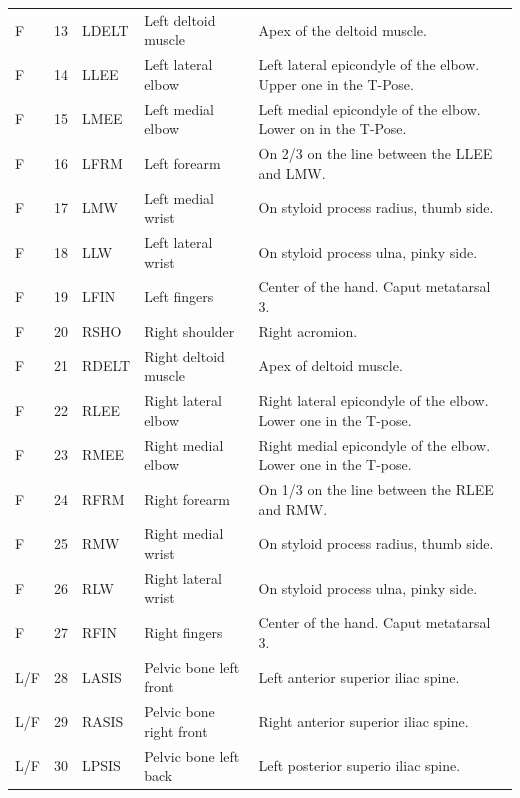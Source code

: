 \documentclass[fleqn,10pt]{wlpeerj}
\begin{document}
\begin{table}
\begin{tabular}{lrlll}
    F   & 13 & LDELT & Left deltoid muscle                   & Apex of the deltoid muscle. \\
    F   & 14 & LLEE  & Left lateral elbow                    & Left lateral epicondyle of the elbow. Upper one in the T-Pose. \\
    F   & 15 & LMEE  & Left medial elbow                     & Left medial epicondyle of the elbow. Lower on in the T-Pose. \\
    F   & 16 & LFRM  & Left forearm                          & On 2/3 on the line between the LLEE and LMW. \\
    F   & 17 & LMW   & Left medial wrist                     & On styloid process radius, thumb side. \\
    F   & 18 & LLW   & Left lateral wrist                    & On styloid process ulna, pinky side. \\
    F   & 19 & LFIN  & Left fingers                          & Center of the hand. Caput metatarsal 3. \\
    F   & 20 & RSHO  & Right shoulder                        & Right acromion. \\
    F   & 21 & RDELT & Right deltoid muscle                  & Apex of deltoid muscle. \\
    F   & 22 & RLEE  & Right lateral elbow                   & Right lateral epicondyle of the elbow. Lower one in the T-pose. \\
    F   & 23 & RMEE  & Right medial elbow                    & Right medial epicondyle of the elbow. Lower one in the T-pose. \\
    F   & 24 & RFRM  & Right forearm                         & On 1/3 on the line between the RLEE and RMW. \\
    F   & 25 & RMW   & Right medial wrist                    & On styloid process radius, thumb side. \\
    F   & 26 & RLW   & Right lateral wrist                   & On styloid process ulna, pinky side. \\
    F   & 27 & RFIN  & Right fingers                         & Center of the hand. Caput metatarsal 3. \\
    L/F & 28 & LASIS & Pelvic bone left front                & Left anterior superior iliac spine. \\
    L/F & 29 & RASIS & Pelvic bone right front               & Right anterior superior iliac spine. \\
    L/F & 30 & LPSIS & Pelvic bone left back                 & Left posterior superio iliac spine. \\

\end{tabular}
\end{table}
\end{document}
